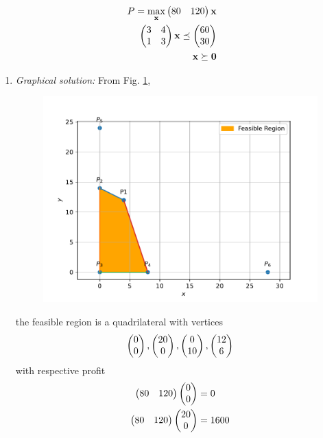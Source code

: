 \documentclass[journal,12pt,twocolumn]{IEEEtran}
\begin{document}
\begin{flushleft}
\begin{align}
        P = \max_{\mathbf{x}}\begin{pmatrix}80 & 120\end{pmatrix}\mathbf{x}
        \\
        \begin{pmatrix}3                    & 4           \\ 1 & 3\end{pmatrix} \mathbf{x}\preceq \begin{pmatrix}60 \\ 30\end{pmatrix}
        \\
        \mathbf{x} \succeq \mathbf{0}
    \end{align}
    \begin{enumerate}
        \item {\em Graphical solution:}
              From Fig.
              \ref{fig:opt-12-2},
              \begin{figure}[!h]
                  \centering
                  \includegraphics[width=\columnwidth]{figs/opt-12-2.pdf}
                  \caption{}
                  \label{fig:opt-12-2}
              \end{figure}
              the feasible region is a quadrilateral with vertices
              \begin{align}
                  \begin{pmatrix}0  \\ 0\end{pmatrix},
                  \begin{pmatrix}20 \\ 0\end{pmatrix},
                  \begin{pmatrix}0  \\ 10\end{pmatrix},
                  \begin{pmatrix}12 \\ 6\end{pmatrix}
              \end{align}
              with respective profit
              \begin{align}
                  \myvec{80 & 120}\myvec{0  \\ 0} &= 0 \\
                  \myvec{80 & 120}\myvec{20 \\ 0} &= 1600 \\

\end{align}
\end{enumerate}
\end{flushleft}
\end{document}
